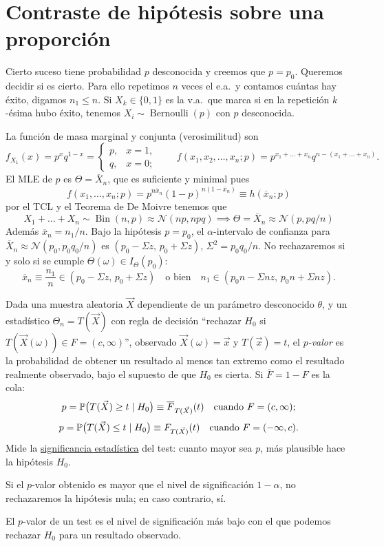 \section{Contraste de hipótesis sobre una proporción}

Cierto suceso tiene probabilidad $p$ desconocida y creemos que $p = p_0$. Queremos decidir si es cierto. Para ello repetimos $n$ veces el e.a.\ y contamos cuántas hay éxito, digamos $n_1 \le n$. Si $X_k \in \{0,1\}$ es la v.a.\ que marca si en la repetición $k$-ésima hubo éxito, tenemos $X_i \sim \operatorname{Bernoulli}(p)$ con $p$ desconocida.

La función de masa marginal y conjunta (verosimilitud) son
\[
  f_{X_1}(x) = p^x q^{1-x} = \begin{cases} p, & x=1, \\ q, & x=0; \end{cases} \qquad f(x_1, x_2, \dots, x_n; p) = p^{x_1 + \dots + x_n} q^{n - (x_1 + \dots + x_n)}.
\]
El MLE de $p$ es $\Theta = \overline{X}_n$, que es suficiente y minimal pues 
$$f(x_1, \dots, x_n; p) = p^{n\overline{x}_n}(1-p)^{n(1-\overline{x}_n)} \equiv h(\overline{x}_n; p)$$
por el TCL y el Teorema de De Moivre tenemos que
$$X_1 + \dots + X_n \sim \operatorname{Bin}(n,p) \approx \mathcal{N}(np, npq) \implies \Theta = \overline{X}_n \approx \mathcal{N}(p, pq/n)$$
Además $\overline{x}_n = n_1/n$. Bajo la hipótesis $p = p_0$, el $\alpha$-intervalo de confianza para $\overline{X}_n \approx \mathcal{N}(p_0, p_0 q_0 / n)$ es $(p_0 - \Sigma z,\, p_0 + \Sigma z)$, $\Sigma^2 = p_0 q_0 / n$. No rechazaremos si y solo si se cumple $\Theta(\omega) \in I_\Theta(p_0)$:
\[
  \overline{x}_n\equiv \frac{n_1}{n} \in (p_0 - \Sigma z,\, p_0 + \Sigma z) \quad \text{o bien} \quad n_1 \in (p_0 n - \Sigma n z,\, p_0 n + \Sigma n z).
\]

\begin{definicion}[76 --- $p$-valor]
Dada una muestra aleatoria $\vec{X}$ dependiente de un parámetro desconocido $\theta$, y un estadístico $\Theta_n = T(\vec{X})$ con regla de decisión ``rechazar $H_0$ si $T(\vec{X}(\omega)) \in F = (c, \infty)$'', observado $\vec{X}(\omega) = \vec{x}$ y $T(\vec{x}) = t$, el \emph{$p$-valor} es la probabilidad de obtener un resultado al menos tan extremo como el resultado realmente observado, bajo el supuesto de que $H_0$ es cierta. Si $\overline{F} = 1 - F$ es la cola:
\[
  p = \mathbb{P}\bigl(T(\vec{X}) \ge t \mid H_0\bigr) \equiv \overline{F}_{T(\vec{X})}(t) \quad \text{cuando } F = (c, \infty);
\]
\[
  p = \mathbb{P}\bigl(T(\vec{X}) \le t \mid H_0\bigr) \equiv F_{T(\vec{X})}(t) \quad \text{cuando } F = (-\infty, c).
\]
Mide la \underline{significancia estadística} del test: cuanto mayor sea $p$, más plausible hace la hipótesis $H_0$. 

Si el $p$-valor obtenido es mayor que el nivel de significación $1-\alpha$, no rechazaremos la hipótesis nula; en caso contrario, sí. 

El $p$-valor de un test es el nivel de significación más bajo con el que podemos rechazar $H_0$ para un resultado observado.
\end{definicion}

